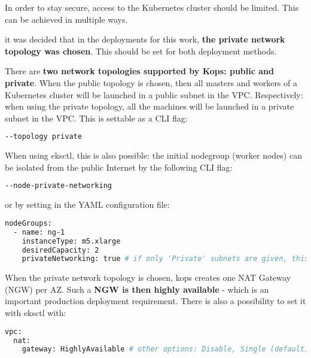 In order to stay secure, access to the Kubernetes cluster should be limited. This can be achieved in multiple ways.


it was decided that in the deployments for this work, \textbf{the private network topology was chosen}. This should be set for both deployment methods.



There are \textbf{two network topologies supported by Kops: public and private}. When the public topology is chosen, then all masters and workers of a Kubernetes cluster will be launched in a public subnet in the VPC. Respectively: when using the private topology, all the machines will be launched in a private subnet in the VPC\cite{kops-net-topo}. This is settable as a CLI flag\cite{kops-net}:
\begin{lstlisting}[basicstyle=\small,caption={CLI flag used by kops to set private networking mode},captionpos=b,language=Bash,xleftmargin=1cm]
--topology private
\end{lstlisting}

When using eksctl, this is also possible: the initial nodegroup (worker nodes) can be isolated from the public Internet by the following CLI flag\cite{eksctl-net}:
\begin{lstlisting}[basicstyle=\small,caption={CLI flag used by eksctl to set private networking mode},captionpos=b,language=Bash,xleftmargin=1cm]
--node-private-networking
\end{lstlisting}
or by setting in the YAML configuration file\cite{eks-example}:
\begin{lstlisting}[basicstyle=\small,caption={YAML configuration used by Kops to set private networking mode},captionpos=b,language=Bash,xleftmargin=1cm]
nodeGroups:
  - name: ng-1
    instanceType: m5.xlarge
    desiredCapacity: 2
    privateNetworking: true # if only 'Private' subnets are given, this must be enabled
\end{lstlisting}


When the private network topology is chosen, kops creates one NAT Gateway (NGW) per AZ\cite{kops-net2}. Such a \textbf{NGW is then highly available} - which is an important production deployment requirement. There is also a possibility to set it with eksctl with\cite{eksctl-net}:
\begin{lstlisting}[basicstyle=\small,caption={YAML configuration used by eksctl to set NAT Gateway as Highly Available},captionpos=b,language=Bash,xleftmargin=1cm]
vpc:
  nat:
    gateway: HighlyAvailable # other options: Disable, Single (default)
\end{lstlisting}

